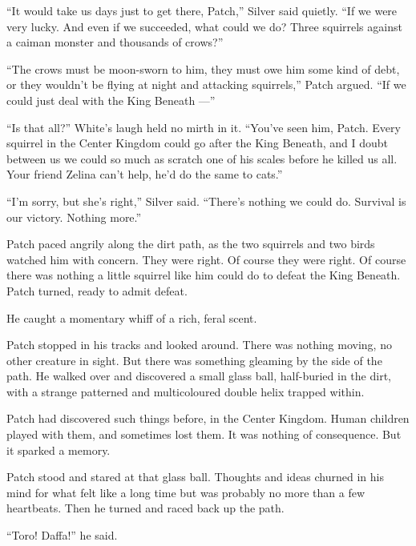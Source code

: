 \documentclass[ebook,oneside,openany,17pt]{memoir}
\newenvironment{tolerant}[1]{%
  \par\tolerance=#1\relax
}{%
  \par
}
\begin{document}
“It would take us days just to get there, Patch,” Silver said
quietly. “If we were very lucky. And even if we succeeded, what could
we do? Three squirrels against a caiman monster and thousands of
crows?”

“The crows must be moon-sworn to him, they must owe him some kind of
debt, or they wouldn’t be flying at night and attacking squirrels,”
Patch argued. “If we could just deal with the King Beneath —”

“Is that all?” White’s laugh held no mirth in it. “You’ve seen him,
Patch. Every squirrel in the Center Kingdom could go after the King
Beneath, and I doubt between us we could so much as scratch one of his
scales before he killed us all. Your friend Zelina can’t help, he’d do
the same to cats.”

“I’m sorry, but she’s right,” Silver said. “There’s nothing we could
do. Survival is our victory. Nothing more.”

Patch paced angrily along the dirt path, as the two squirrels and two
birds watched him with concern. They were right. Of course they were
right. Of course there was nothing a little squirrel like him could do
to defeat the King Beneath. Patch turned, ready to admit defeat.

\begin{tolerant}{2000}
He caught a momentary whiff of a rich, feral scent.
\end{tolerant}

\begin{tolerant}{1000}
Patch stopped in his tracks and looked around. There was nothing
moving, no other creature in sight. But there was something gleaming
by the side of the path. He walked over and discovered a small glass
ball, half-buried in the dirt, with a strange patterned and
multicoloured double helix trapped within.
\end{tolerant}

Patch had discovered such things before, in the Center Kingdom. Human
children played with them, and sometimes lost them. It was nothing of
consequence. But it sparked a memory.

\begin{tolerant}{500}
Patch stood and stared at that glass ball. Thoughts and ideas churned
in his mind for what felt like a long time but was probably no more
than a few heartbeats. Then he turned and raced back up the path.
\end{tolerant}

“Toro! Daffa!” he said.
\end{document}
